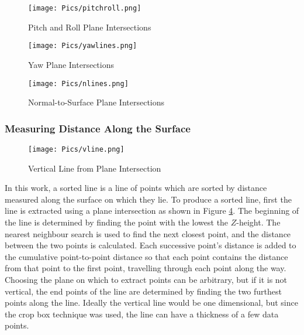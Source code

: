 \begin{figure}[H]
    \centering
    \texttt{[image: Pics/pitchroll.png]}
    \caption{Pitch and Roll Plane Intersections}
    \label{fig:pitchroll}
\end{figure}
\begin{figure}[H]
    \centering
    \texttt{[image: Pics/yawlines.png]}
    \caption{Yaw Plane Intersections}
    \label{fig:yawplane}
\end{figure}

\begin{figure}[H]
    \centering
    \texttt{[image: Pics/nlines.png]}
    \caption{Normal-to-Surface Plane Intersections}
    \label{fig:nplanes}
\end{figure}

\subsubsection{Measuring Distance Along the Surface}

\begin{figure}[H]
    \centering
    \texttt{[image: Pics/vline.png]}
    \caption{Vertical Line from Plane Intersection}
    \label{fig:vline}
\end{figure}

In this work, a sorted line is a line of points which are sorted by distance measured along the surface on which they lie. To produce a sorted line, first the line is extracted using a plane intersection as shown in Figure \ref{fig:vline}. The beginning of the line is determined by finding the point with the lowest the $Z$-height. The nearest neighbour search is used to find the next closest point, and the distance between the two points is calculated. Each successive point's distance is added to the cumulative point-to-point distance so that each point contains the distance from that point to the first point, travelling through each point along the way. Choosing the plane on which to extract points can be arbitrary, but if it is not vertical, the end points of the line are determined by finding the two furthest points along the line. Ideally the vertical line would be one dimensional, but since the crop box technique was used, the line can have a thickness of a few data points. \\

